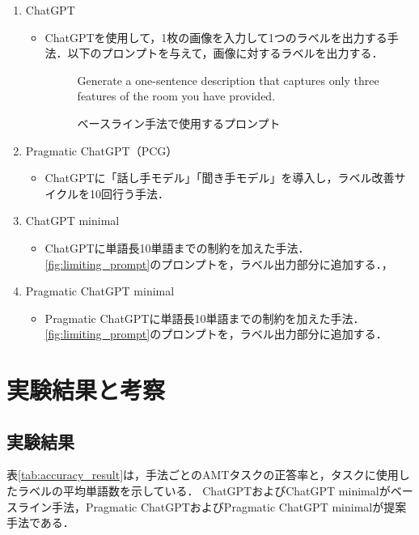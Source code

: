 \documentclass[a4paper,11pt]{jreport}
\begin{document}
\begin{enumerate}
  \item ChatGPT
  \begin{itemize}
  \item ChatGPTを使用して，1枚の画像を入力して1つのラベルを出力する手法．以下のプロンプトを与えて，画像に対するラベルを出力する．
  \begin{figure}[H]
    \begin{mdframed}[linewidth=1pt]
      Generate a one-sentence description that captures only three features of the room you have provided.
    \end{mdframed}
    \caption{ベースライン手法で使用するプロンプト}
    \label{fig:baseline_prompt}
  \end{figure}
\end{itemize}
  
  \item Pragmatic ChatGPT（PCG）
  \begin{itemize}
    \item ChatGPTに「話し手モデル」「聞き手モデル」を導入し，ラベル改善サイクルを10回行う手法．
  \end{itemize}
    
  \item ChatGPT minimal
  \begin{itemize}
    \item ChatGPTに単語長10単語までの制約を加えた手法．\ref{fig:limiting_prompt}のプロンプトを，ラベル出力部分に追加する．，
  \end{itemize}
  
  \item Pragmatic ChatGPT minimal
  \begin{itemize}
    \item Pragmatic ChatGPTに単語長10単語までの制約を加えた手法．\ref{fig:limiting_prompt}のプロンプトを，ラベル出力部分に追加する．
  \end{itemize}
  
\end{enumerate}

\section{実験結果と考察}

\subsection{実験結果}

表\ref{tab:accuracy_result}は，手法ごとのAMTタスクの正答率と，タスクに使用したラベルの平均単語数を示している．
ChatGPTおよびChatGPT minimalがベースライン手法，Pragmatic ChatGPTおよびPragmatic ChatGPT minimalが提案手法である．
\end{document}
